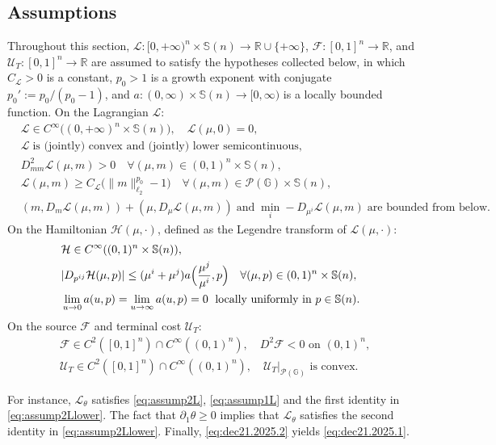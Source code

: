 \documentclass[10pt]{article}
\numberwithin{equation}{section}
\newcommand{\cF}{ \mathcal{F}}
\newcommand{\cH}{ \mathcal{H}}
\newcommand{\cL}{ \mathcal{L}}
\newcommand{\cP}{ \mathcal{P}}
\newcommand{\cU}{ \mathcal{U}}
\newcommand{\bG}{\mathbb G}
\newcommand{\bR}{\mathbb R}
\newcommand{\bS}{\mathbb S}
\def\cH{\mathcal{H}}
\def\cL{\mathcal{L}}
\begin{document}
\subsection{Assumptions}\label{subsection:assumptions-g}
Throughout this section, $\cL:[0,+\infty)^n\times\bS(n)\to\bR\cup\{+\infty\}$, $\cF:[0,1]^n\to\bR$, and $\cU_T:[0,1]^n\to\bR$ are assumed to satisfy the hypotheses collected below, in which $C_\cL>0$ is a constant, $p_0>1$ is a growth exponent with conjugate $p_0':=p_0/(p_0-1)$, and $a:(0,\infty)\times\bS(n)\to[0,\infty)$ is a locally bounded function. On the Lagrangian $\cL$:
\begin{align}
& \cL \in C^\infty\big((0,+\infty)^n \times \bS(n)\big), \quad \cL(\mu,  0)=0, \label{eq:assump2L}\\
& \cL\; \text{is (jointly) convex and (jointly) lower semicontinuous},\label{eq:assump1L}\\
& D_{mm}^2 \cL(\mu, m)>0\quad \forall (\mu, m) \in (0,1)^n \times \bS(n),\label{eq:assump1LDec2025}\\
& \cL(\mu, m)\geq C_{\cL}\big(\|m\|_{\ell_2}^{p_0}-1\big)\quad \forall (\mu,m)\in \cP(\bG)\times \bS(n),\label{eq:may24.2025.3}\\
& (m, D_m \cL(\mu, m)) + (\mu, D_\mu \cL(\mu, m)) \;\text{and}\; \min_i -D_{\mu^i} \cL(\mu, m)\; \text{are bounded from below}.\label{eq:assump2Llower}
\end{align}
On the Hamiltonian $\cH(\mu,\cdot)$, defined as the Legendre transform of $\cL(\mu,\cdot)$:
\begin{align}
& \cH \in C^\infty((0,1)^n \times \bS(n)),\label{eq:dec20.2025.2}\\
& |D_{p^{ij}} \cH(\mu, p)|\leq (\mu^i+\mu^j) a\Big({\mu^j \over \mu^i},p \Big)\quad \forall (\mu, p) \in (0,1)^n \times \bS(n),\label{eq:dec21.2025.1}\\
& \lim_{u\to 0}a(u,p) = \lim_{u\to \infty}a(u,p)=0 \;\text{ locally uniformly in } p\in \bS(n).\label{eq:dec21.2025.3}
\end{align}
On the source $\cF$ and terminal cost $\cU_T$:
\begin{align}
& \cF \in C^2([0,1]^n) \cap C^\infty((0,1)^n), \quad D^2 \cF < 0 \text{ on } (0,1)^n,\label{eq:assumpF}\\
& \cU_T\in C^2([0,1]^n) \cap C^\infty((0,1)^n), \quad \cU_T|_{\cP(\bG)} \text{ is convex}.\label{eq:assumpcUT}
\end{align}

For instance, $\cL_\theta$ satisfies \eqref{eq:assump2L}, \eqref{eq:assump1L} and the first identity in \eqref{eq:assump2Llower}. The fact that $\partial_1 \theta \geq 0$ implies that $\cL_\theta$ satisfies the second identity in \eqref{eq:assump2Llower}. Finally, \eqref{eq:dec21.2025.2} yields \eqref{eq:dec21.2025.1}.
\end{document}
